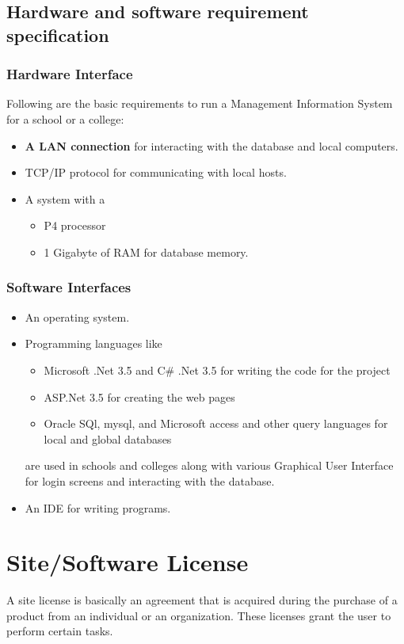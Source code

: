 \documentclass[12pt, a4paper]{article}
\begin{document}
\subsection{Hardware and software requirement specification}
\subsubsection{Hardware Interface}
Following are the basic requirements to run a Management Information System 
for a school or a college:
\begin{itemize}
  \item \textbf{A LAN connection} for interacting with the database and local 
    computers.
  \item TCP/IP protocol for communicating with local hosts.
  \item A system with a
    \begin{itemize}
      \item P4 processor
      \item 1 Gigabyte of RAM for database memory.
    \end{itemize}
\end{itemize}

\subsubsection{Software Interfaces}
\begin{itemize}
  \item An operating system.
  \item Programming languages like
    \begin{itemize}
      \item Microsoft .Net 3.5 and C\# .Net 3.5 for writing the code for the
        project
      \item ASP.Net 3.5 for creating the web pages
      \item Oracle SQl, mysql, and Microsoft access and other query languages
        for local and global databases
    \end{itemize}
    are used in schools and colleges along with various Graphical User
    Interface for login screens and interacting with the database.
  \item An IDE for writing programs.
\end{itemize}

\section{Site/Software License}%
A site license is basically an agreement that is acquired during the purchase
of a product from an individual or an organization. These licenses grant the 
user to perform certain tasks.
\end{document}
